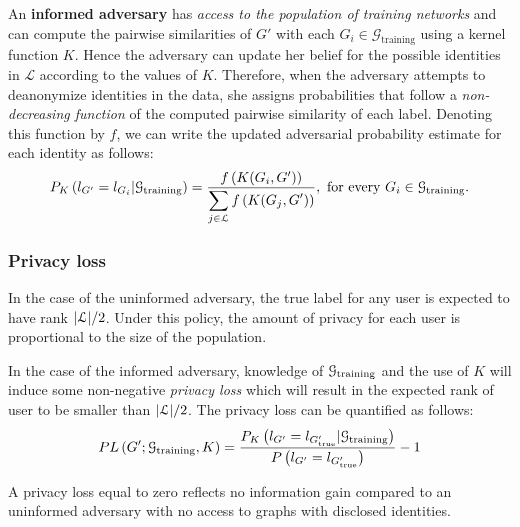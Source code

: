 An \textbf{informed adversary} has \emph{access to the population of training networks} and can compute the pairwise similarities of $ G' $ with each $ G_{i} \in \mathcal{G}_{\text{training}} $ using a kernel function $K$. Hence the adversary can update her belief for the possible identities in $ \mathcal{L} $ according to the values of $K$.
Therefore, when the adversary attempts to deanonymize identities in the data, she assigns probabilities that follow a \emph{non-decreasing function} {of the computed pairwise similarity} of each label.
Denoting this function by $f$, we can write the updated adversarial probability estimate for each identity as follows:
\[
	P_K\left(l_{G'} =l_{G_i}| \mathcal{G}_{\text{training}}\right) =  \frac{f\left(K(G_i, G')\right)}{\displaystyle \sum_{j\in \mathcal{L}}  f\left(K(G_j, G')\right)},   \mbox{ for every }  G_i \in \mathcal{G}_{\text{training}}.
	\label{eq:adversarial_rule}
\]




\subsubsection{Privacy loss}

In the case of the uninformed adversary, the true label for any user is expected to have rank $ |\mathcal{L}|/2$. Under this policy, the amount of privacy for each user is proportional to the size of the population.

In the case of the informed adversary, knowledge of $ \mathcal{G}_\text{training} $ and the use of $ K $ will induce some non-negative \emph{privacy loss} which will result in the expected rank of user to be smaller than $ |\mathcal{L}|/2$. The privacy loss can be quantified as follows:
\[
	PL\left(G';\mathcal{G}_{\text{training}}, K\right) = \frac{P_K\left(l_{G'}= l_{G'_\text{true}}|\mathcal{G}_{\text{training}}\right)}{P\left(l_{G'}= l_{G'_\text{true}}\right)} -1
	\label{eq:privloss}
\]

A privacy loss equal to zero reflects no information gain compared to an uninformed adversary with no access to graphs with disclosed identities.

